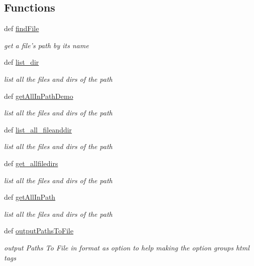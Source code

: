\subsection*{Functions}
\begin{DoxyCompactItemize}
\item 
def \hyperlink{namespaceweb_1_1xml_parse_a3b372b8bdc761af013717f8830c16551}{find\-File}
\begin{DoxyCompactList}\small\item\em get a file's path by its name \end{DoxyCompactList}\item 
def \hyperlink{namespaceweb_1_1xml_parse_a8cafc0755a63011514d64d6ac120ac5e}{list\-\_\-dir}
\begin{DoxyCompactList}\small\item\em list all the files and dirs of the path \end{DoxyCompactList}\item 
def \hyperlink{namespaceweb_1_1xml_parse_adb3ca98dde0a817707f1d1e8c22bcece}{get\-All\-In\-Path\-Demo}
\begin{DoxyCompactList}\small\item\em list all the files and dirs of the path \end{DoxyCompactList}\item 
def \hyperlink{namespaceweb_1_1xml_parse_a694b1591e6131cb36e7f21dc2a8351aa}{list\-\_\-all\-\_\-fileanddir}
\begin{DoxyCompactList}\small\item\em list all the files and dirs of the path \end{DoxyCompactList}\item 
def \hyperlink{namespaceweb_1_1xml_parse_a3b0e7e3415dfeae62dfbe33053d165e2}{get\-\_\-allfiledirs}
\begin{DoxyCompactList}\small\item\em list all the files and dirs of the path \end{DoxyCompactList}\item 
def \hyperlink{namespaceweb_1_1xml_parse_a3969e676a453939509762befc13140e1}{get\-All\-In\-Path}
\begin{DoxyCompactList}\small\item\em list all the files and dirs of the path \end{DoxyCompactList}\item 
def \hyperlink{namespaceweb_1_1xml_parse_a1484b327ca60f3e8bc915f897fe1e5f4}{output\-Paths\-To\-File}
\begin{DoxyCompactList}\small\item\em output Paths To File in format as option to help making the option groups html tags \end{DoxyCompactList}\end{DoxyCompactItemize}


